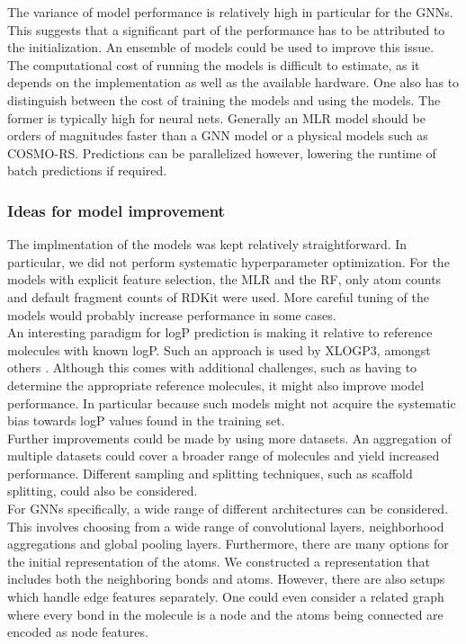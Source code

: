 \documentclass{article}
\theoremstyle{definition}
\theoremstyle{remark}
\begin{document}
The variance of model performance is relatively high in particular for the GNNs. This suggests that a significant part of the performance has to be attributed to the initialization. An ensemble of models could be used to improve this issue. \\

The computational cost of running the models is difficult to estimate, as it depends on the implementation as well as the available hardware. One also has to distinguish between the cost of training the models and using the models. The former is typically high for neural nets. Generally an MLR model should be orders of magnitudes faster than a GNN model or a physical models such as COSMO-RS. Predictions can be parallelized however, lowering the runtime of batch predictions if required. \\

\subsubsection{Ideas for model improvement}

The implmentation of the models was kept relatively straightforward. In particular, we did not perform systematic hyperparameter optimization. For the models with explicit feature selection, the MLR and the RF, only atom counts and default fragment counts of RDKit were used. More careful tuning of the models would probably increase performance in some cases. \\

An interesting paradigm for logP prediction is making it relative to reference molecules with known logP. Such an approach is used by XLOGP3, amongst others \cite{cheng2007computation}. Although this comes with additional challenges, such as having to determine the appropriate reference molecules, it might also improve model performance. In particular because such models might not acquire the systematic bias towards logP values found in the training set. \\

Further improvements could be made by using more datasets. An aggregation of multiple datasets could cover a broader range of molecules and yield increased performance. Different sampling and splitting techniques, such as scaffold splitting, could also be considered. \\

For GNNs specifically, a wide range of different architectures can be considered. This involves choosing from a wide range of convolutional layers, neighborhood aggregations and global pooling layers. Furthermore, there are many options for the initial representation of the atoms. We constructed a representation that includes both the neighboring bonds and atoms. However, there are also setups which handle edge features separately. One could even consider a related graph where every bond in the molecule is a node and the atoms being connected are encoded as node features. \\
\end{document}
